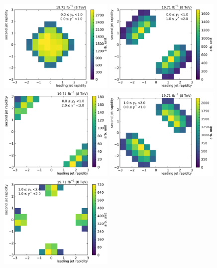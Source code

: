 \begin{figure}[htbp]
    \centering
    \includegraphics[width=0.49\textwidth]{figures/measurement/jet12_rapidity_yb0ys0.pdf}\hfill
    \includegraphics[width=0.49\textwidth]{figures/measurement/jet12_rapidity_yb0ys1.pdf}
    \includegraphics[width=0.49\textwidth]{figures/measurement/jet12_rapidity_yb0ys2.pdf}\hfill
    \includegraphics[width=0.49\textwidth]{figures/measurement/jet12_rapidity_yb1ys0.pdf}
    \includegraphics[width=0.49\textwidth]{figures/measurement/jet12_rapidity_yb1ys1.pdf}\hfill

\end{figure}
